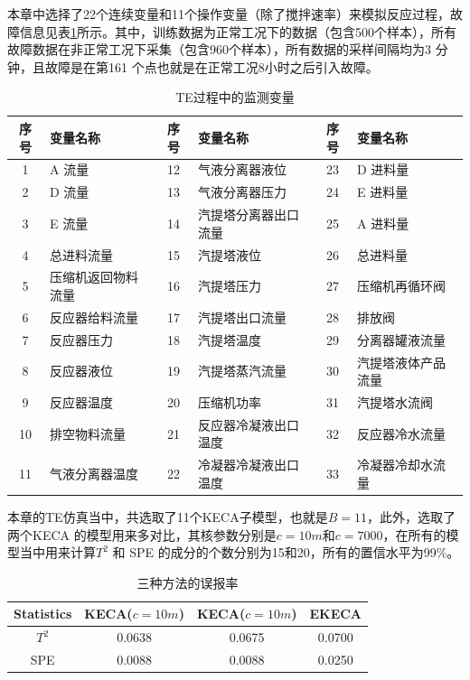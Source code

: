 本章中选择了22个连续变量和11个操作变量（除了搅拌速率）来模拟反应过程，故障信息见表\ref{process var}所示。其中，训练数据为正常工况下的数据（包含500个样本），所有故障数据在非正常工况下采集（包含960个样本），所有数据的采样间隔均为3 分钟，且故障是在第161 个点也就是在正常工况8小时之后引入故障。
\begin{table}[!htb]
\caption{TE过程中的监测变量}
\label{process var}
\centering
\begin{tabular}{c l c l c l}
  \hline \hline
  序号   & 变量名称 & 序号   & 变量名称 & 序号   & 变量名称\\
  \hline
  1 & A 流量 &  12 & 气液分离器液位 & 23 & D 进料量  \\
  2 & D 流量 &  13 & 气液分离器压力 & 24 & E 进料量\\
  3 & E 流量 &  14 & 汽提塔分离器出口流量 &25 & A 进料量\\
  4 & 总进料流量 &15 & 汽提塔液位 & 26 & 总进料量\\
  5 & 压缩机返回物料流量 &16 & 汽提塔压力 &27 & 压缩机再循环阀\\
  6 & 反应器给料流量 &17 & 汽提塔出口流量 &28 & 排放阀\\
  7 & 反应器压力 &18 & 汽提塔温度 & 29 & 分离器罐液流量\\
  8 & 反应器液位     &19 & 汽提塔蒸汽流量 & 30 & 汽提塔液体产品流量\\
  9 & 反应器温度 &20 & 压缩机功率 & 31 & 汽提塔水流阀    \\
  10 & 排空物料流量 &21 & 反应器冷凝液出口温度& 32 & 反应器冷水流量\\
  11 & 气液分离器温度 &22 & 冷凝器冷凝液出口温度 & 33 & 冷凝器冷却水流量\\
  \hline \hline
\end{tabular}
 \vspace*{-.3cm}
\end{table}
本章的TE仿真当中，共选取了11个KECA子模型，也就是$B=11$，此外，选取了两个KECA 的模型用来多对比，其核参数分别是$c=10m$和$c=7000$，在所有的模型当中用来计算$T^2$ 和 SPE 的成分的个数分别为15和20，所有的置信水平为99\%。
\begin{table}[!htb]
\centering
\caption{三种方法的误报率}
\label{Alamrate}
\begin{tabular}{cccc}
\hline\hline
   Statistics & KECA($c=10m$) & KECA($c=10m$) & EKECA   \\
 \hline
 $T^2$ & 0.0638 & 0.0675 & 0.0700 \\
 SPE & 0.0088 & 0.0088 & 0.0250 \\
 \hline\hline
\end{tabular}
\end{table}

